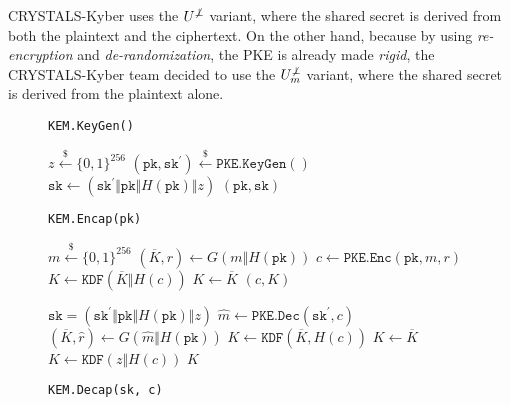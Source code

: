 \documentclass[journal=tches,submission]{iacrtrans}
\newcommand{\pk}{\texttt{pk}}
\newcommand{\sk}{\texttt{sk}}
\newcommand{\leftsample}{\stackrel{\$}{\leftarrow}}
\begin{document}
CRYSTALS-Kyber uses the $U^{\not\bot}$ variant, where the shared secret is derived from both the plaintext and the ciphertext. On the other hand, because by using \emph{re-encryption} and \emph{de-randomization}, the PKE is already made \emph{rigid}, the CRYSTALS-Kyber team decided to use the $U^{\not\bot}_m$ variant, where the shared secret is derived from the plaintext alone.

\begin{figure}[H]
    \centering
    \begin{minipage}[t]{0.45\textwidth}
        \begin{algorithm}[H]
            \caption*{\texttt{KEM.KeyGen()}}
            \begin{algorithmic}[1]
                \State $z \leftsample \{0,1\}^{256}$
                \State $(\pk, \sk^\prime) \leftsample \texttt{PKE.KeyGen}()$
                \State $\sk \leftarrow (\sk^\prime \Vert \pk \Vert H(\pk) \Vert z)$
                \State \Return $(\pk, \sk)$
            \end{algorithmic}
        \end{algorithm}
        \begin{algorithm}[H]
            \caption*{\texttt{KEM.Encap(pk)}}
            \begin{algorithmic}[1]
                \State $m \leftsample \{0,1\}^{256}$
                \State $(\overline{K}, r) \leftarrow G(m \Vert H(\pk))$
                \State $c \leftarrow \texttt{PKE.Enc}(\pk, m, r)$
                \State $K \leftarrow \texttt{KDF}(\overline{K} \Vert H(c))$
                \State $K \leftarrow \overline{K}$
                \State \Return $(c, K)$
            \end{algorithmic}
        \end{algorithm}
    \end{minipage}
    \begin{minipage}[t]{0.5\textwidth}
        \begin{algorithm}[H]
            \caption*{\texttt{KEM.Decap(sk, c)}}
            \begin{algorithmic}[1]
                \Ensure $\sk = (\sk^\prime \Vert \pk \Vert H(\pk) \Vert z)$
                \State $\hat{m} \leftarrow \texttt{PKE.Dec}(\sk^\prime, c)$
                \State $(\overline{K}, \hat{r}) \leftarrow G(\hat{m} \Vert H(\pk))$
                \If{$\texttt{PKE.Enc}(\pk, \hat{m}, \hat{r}) = c$}
                    \State $K \leftarrow \texttt{KDF}(\overline{K}, H(c))$
                    \State $K \leftarrow \overline{K}$
                \Else 
                    \State $K \leftarrow \texttt{KDF}(z \Vert H(c))$
                \EndIf
                \State \Return $K$
            \end{algorithmic}
        \end{algorithm}
    \end{minipage}


\end{figure}
\end{document}

